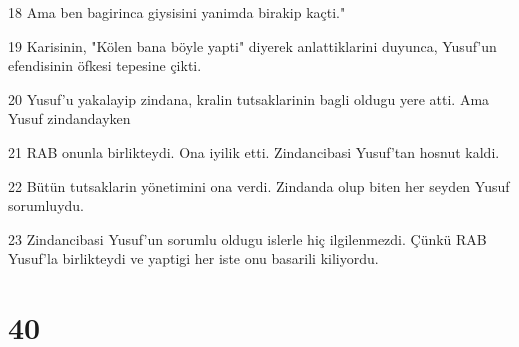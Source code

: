 \par 18 Ama ben bagirinca giysisini yanimda birakip kaçti."
\par 19 Karisinin, "Kölen bana böyle yapti" diyerek anlattiklarini duyunca, Yusuf'un efendisinin öfkesi tepesine çikti.
\par 20 Yusuf'u yakalayip zindana, kralin tutsaklarinin bagli oldugu yere atti. Ama Yusuf zindandayken
\par 21 RAB onunla birlikteydi. Ona iyilik etti. Zindancibasi Yusuf'tan hosnut kaldi.
\par 22 Bütün tutsaklarin yönetimini ona verdi. Zindanda olup biten her seyden Yusuf sorumluydu.
\par 23 Zindancibasi Yusuf'un sorumlu oldugu islerle hiç ilgilenmezdi. Çünkü RAB Yusuf'la birlikteydi ve yaptigi her iste onu basarili kiliyordu.

\chapter{40}

